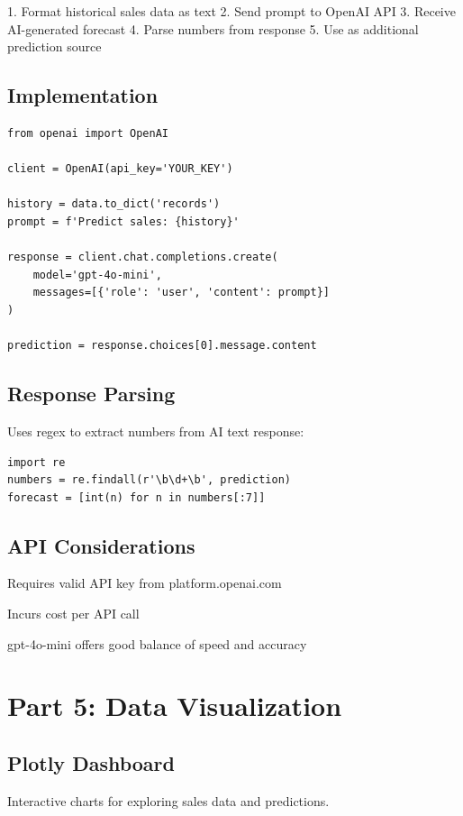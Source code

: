 \documentclass{article}
\begin{document}
1. Format historical sales data as text
2. Send prompt to OpenAI API
3. Receive AI-generated forecast
4. Parse numbers from response
5. Use as additional prediction source

\subsection{Implementation}

\begin{verbatim}
from openai import OpenAI

client = OpenAI(api_key='YOUR_KEY')

history = data.to_dict('records')
prompt = f'Predict sales: {history}'

response = client.chat.completions.create(
    model='gpt-4o-mini',
    messages=[{'role': 'user', 'content': prompt}]
)

prediction = response.choices[0].message.content
\end{verbatim}

\subsection{Response Parsing}

Uses regex to extract numbers from AI text response:

\begin{verbatim}
import re
numbers = re.findall(r'\b\d+\b', prediction)
forecast = [int(n) for n in numbers[:7]]
\end{verbatim}

\subsection{API Considerations}

Requires valid API key from platform.openai.com

Incurs cost per API call

gpt-4o-mini offers good balance of speed and accuracy

\section{Part 5: Data Visualization}

\subsection{Plotly Dashboard}

Interactive charts for exploring sales data and predictions.
\end{document}
